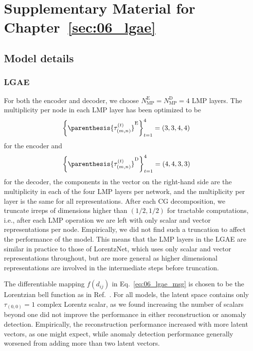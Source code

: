\chapter{Supplementary Material for Chapter~\ref{sec:06_lgae}}
\label{app:06}

\section{Model details}
\label{app:06_lgae_hyperparams}

\subsection{LGAE}

For both the encoder and decoder, we choose $N_{\mathrm{MP}}^{\mathrm{E}} = N_{\mathrm{MP}}^{\mathrm{D}} = 4$ LMP layers.
The multiplicity per node in each LMP layer has been optimized to be
\begin{equation}
    \left\{ \parenthesis{\tau_{(m, n)}^{(t)}}^{\mathrm{E}} \right\}_{t=1}^{4} = (3,3,4,4)
\end{equation}
for the encoder and
\begin{equation}
    \left\{ \parenthesis{\tau_{(m, n)}^{(t)}}^{\mathrm{D}} \right\}_{t=1}^{4} = (4,4,3,3)
\end{equation}
for the decoder, the components in the vector on the right-hand side are the multiplicity in each of the four LMP layers per network, and the multiplicity per layer is the same for all representations.
After each CG decomposition, we truncate irreps of dimensions higher than $(1/2, 1/2)$ for tractable computations, i.e., after each LMP operation we are left with only scalar and vector representations per node.
Empirically, we did not find such a truncation to affect the performance of the model.
This means that the LMP layers in the LGAE are similar in practice to those of LorentzNet, which uses only scalar and vector representations throughout, but are more general as higher dimensional representations are involved in the intermediate steps before truncation.

The differentiable mapping $f(d_{ij})$ in Eq.~\ref{eq:06_lgae_msg} is chosen to be the Lorentzian bell function as in Ref.~\cite{bogatskiy2020lorentz}.
For all models, the latent space contains only $\tau_{(0,0)} = 1$ complex Lorentz scalar, as we found increasing the number of scalars beyond one did not improve the performance in either reconstruction or anomaly detection.
Empirically, the reconstruction performance increased with more latent vectors, as one might expect, while anomaly detection performance generally worsened from adding more than two latent vectors.

